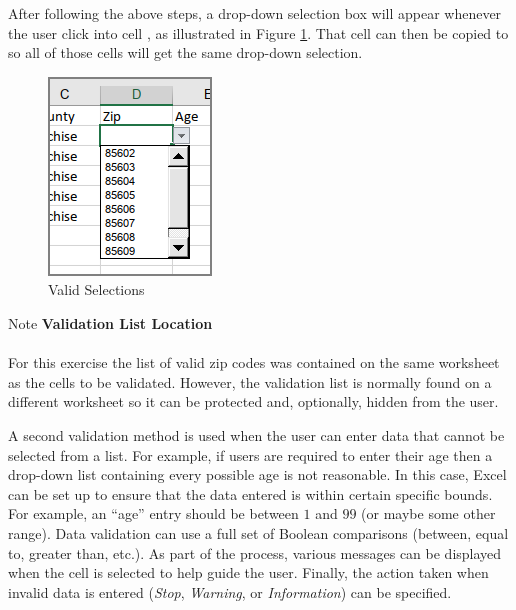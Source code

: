 After following the above steps, a drop-down selection box will appear whenever the user click into cell , as illustrated in Figure \ref{07:fig38}. That cell can then be copied to  so all of those cells will get the same drop-down selection.

\begin{figure}[H]
	\centering
	\includegraphics[width=\maxwidth{.95\linewidth}]{gfx/ch07_fig38}
	\caption{Valid Selections}
	\label{07:fig38}
\end{figure}

\begin{center}
	\begin{infobox}{Note}
		\textbf{Validation List Location}
		\\
		\\
		For this exercise the list of valid zip codes was contained on the same worksheet as the cells to be validated. However, the validation list is normally found on a different worksheet so it can be protected and, optionally, hidden from the user.
	\end{infobox}
\end{center}

A second validation method is used when the user can enter data that cannot be selected from a list. For example, if users are required to enter their age then a drop-down list containing every possible age is not reasonable. In this case, Excel can be set up to ensure that the data entered is within certain specific bounds. For example, an ``age'' entry should be between $ 1 $ and $ 99 $ (or maybe some other range). Data validation can use a full set of Boolean comparisons (between, equal to, greater than, etc.). As part of the process, various messages can be displayed when the cell is selected to help guide the user. Finally, the action taken when invalid data is entered (\textit{Stop}, \textit{Warning}, or \textit{Information}) can be specified.

